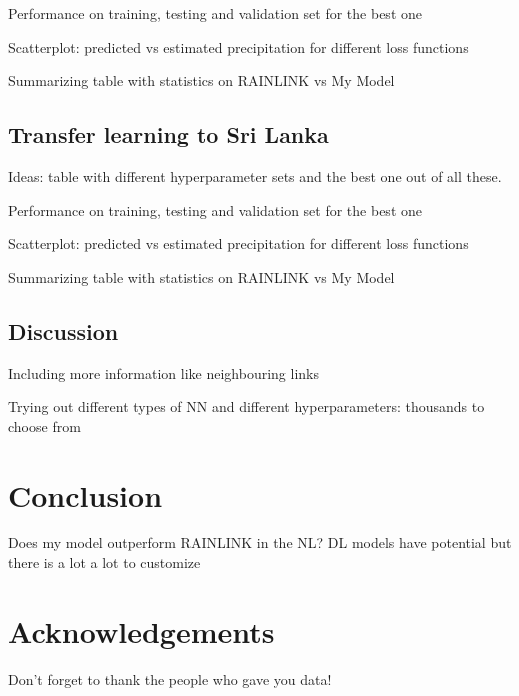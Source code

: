 \documentclass[twocolumn, 10pt, a4paper]{memoir}
\begin{document}
Performance on training, testing and validation set for the best one

Scatterplot: predicted vs estimated precipitation for different loss functions

Summarizing table with statistics on RAINLINK vs My Model

\section{Transfer learning to Sri Lanka}
Ideas: table with different hyperparameter sets and the best one out of all these. 

Performance on training, testing and validation set for the best one

Scatterplot: predicted vs estimated precipitation for different loss functions

Summarizing table with statistics on RAINLINK vs My Model

\section{Discussion} \label{ch: discussion}
Including more information like neighbouring links

Trying out different types of NN and different hyperparameters: thousands to choose from

\chapter{Conclusion} \label{ch: conclusion}
Does my model outperform RAINLINK in the NL?
DL models have potential but there is a lot a lot to customize



\chapter*{Acknowledgements}\vspace{-6mm}       %

Don't forget to thank the people who gave you data!



\renewcommand{\bibname}{Bibliography} 


\end{document}
